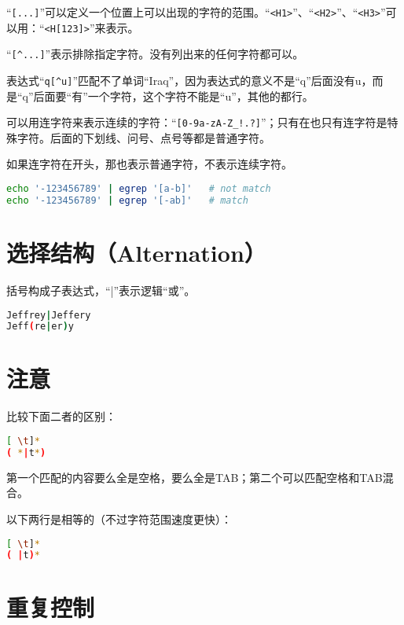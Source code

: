 “\verb|[...]|”可以定义一个位置上可以出现的字符的范围。“\verb|<H1>|”、“\verb|<H2>|”、“\verb|<H3>|”可以用：“\verb|<H[123]>|”来表示。

“\verb|[^...]|”表示排除指定字符。没有列出来的任何字符都可以。

表达式“\verb|q[^u]|”匹配不了单词“Iraq”，因为表达式的意义不是“q”后面没有u，而是“q”后面要“有”一个字符，这个字符不能是“u”，其他的都行。

可以用连字符来表示连续的字符：“\verb|[0-9a-zA-Z_!.?]|”；只有在也只有连字符是特殊字符。后面的下划线、问号、点号等都是普通字符。

如果连字符在开头，那也表示普通字符，不表示连续字符。
\begin{lstlisting}[language=bash]
echo '-123456789' | egrep '[a-b]'   # not match
echo '-123456789' | egrep '[-ab]'   # match
\end{lstlisting}



\section{选择结构（Alternation）}

括号构成子表达式，“\verb|||”表示逻辑“或”。
\begin{lstlisting}[language=bash]
Jeffrey|Jeffery
Jeff(re|er)y
\end{lstlisting}



\section{注意}

比较下面二者的区别：

\begin{lstlisting}[language=bash]
[ \t]*
( *|t*)
\end{lstlisting}

第一个匹配的内容要么全是空格，要么全是TAB；第二个可以匹配空格和TAB混合。

以下两行是相等的（不过字符范围速度更快）：

\begin{lstlisting}[language=bash]
[ \t]*
( |t)*
\end{lstlisting}



\section{重复控制}

